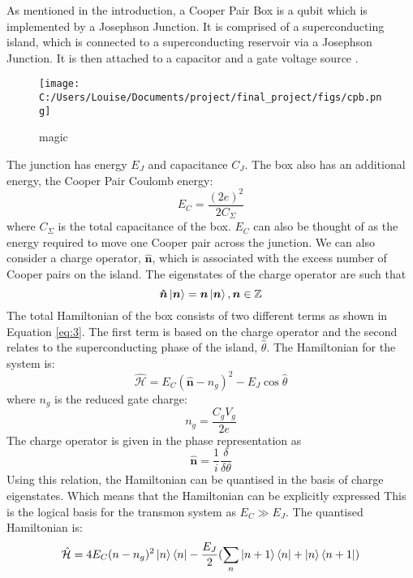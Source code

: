 \documentclass[11pt]{article}
\newcommand*{\hatH}{\hat{\mathcal{H}}}
\begin{document}
As mentioned in the introduction, a Cooper Pair Box is a qubit which is implemented by a Josephson Junction. It is comprised of a superconducting island, which is connected to a superconducting reservoir via a Josephson Junction. It is then attached to a capacitor and a gate voltage source \cite{cottetImplementationQuantumBit2002}.
\begin{figure}[ht]
\centering
\texttt{[image: C:/Users/Louise/Documents/project/final\_project/figs/cpb.png]}
\caption{magic}
\label{fig:picture3}
\end{figure}
The junction has energy $E_J$ and capacitance $C_J$. The box also has an additional energy, the Cooper Pair Coulomb energy:
\begin{equation} \label{eq:1}
E_C =  \frac{(2e)^2}{2C_\Sigma}
\end{equation}
where $C_\Sigma$ is the total capacitance of the box. $E_C$ can also be thought of as the energy required to move one Cooper pair across the junction. We can also consider a charge operator, $\boldsymbol{\hat{n}}$, which is associated with the excess number of Cooper pairs on the island. The eigenstates of the charge operator are such that
\begin{equation} \label{eq:2}
\boldsymbol{\hat{n}}\ket{\boldsymbol{n}} = \boldsymbol{n}\ket{\boldsymbol{n}},  \boldsymbol{n} \in \mathbb{Z}
\end{equation}
The total Hamiltonian of the box consists of two different terms as shown in Equation \ref{eq:3}. The first term is based on the charge operator and the second relates to the superconducting phase of the island, $\hat{\theta}$. The Hamiltonian for the system is:
\begin{equation} \label{eq:3}
\hatH = E_C (\boldsymbol{\hat{n}} - n_g)^2 - E_J \cos{\hat{\theta}}
\end{equation}
where $n_g$ is the reduced gate charge:
\begin{equation} \label{eq:4}
n_g = \frac{C_g V_g}{2e}
\end{equation}
The charge operator is given in the phase representation as
\begin{equation} \label{eq:5}
\boldsymbol{\hat{n}} = \frac{1}{i} \frac{\delta}{\delta\theta}
\end{equation}
Using this relation, the Hamiltonian can be quantised in the basis of charge eigenstates. Which means that the Hamiltonian can be explicitly expressed  This is the logical basis for the transmon system as $E_C \gg E_J$. The quantised Hamiltonian is:
\begin{equation} \label{eq:6}
\hatH = 4E_C (n-n_g)^2 \ket{n}\bra{n} - \frac{E_J}{2}(\sum_{n} \ket{n+1}\bra{n} + \ket{n}\bra{n+1})
\end{equation}
\end{document}
